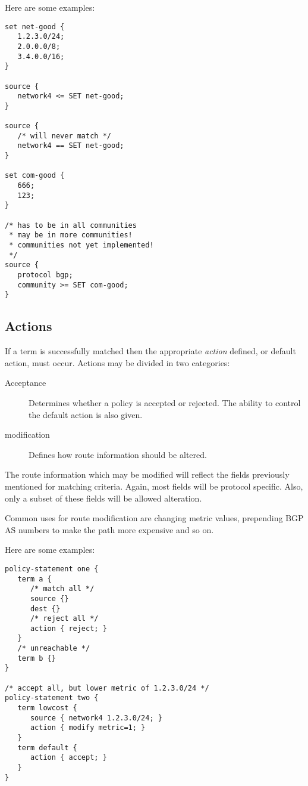 \documentclass{article}
\begin{document}
Here are some examples:
\begin{verbatim}
set net-good {
   1.2.3.0/24;
   2.0.0.0/8;
   3.4.0.0/16;
}

source {
   network4 <= SET net-good;
}

source {
   /* will never match */
   network4 == SET net-good;
}

set com-good {
   666;
   123; 
}

/* has to be in all communities 
 * may be in more communities!
 * communities not yet implemented!
 */
source {
   protocol bgp;
   community >= SET com-good;
}
\end{verbatim}



\subsection{Actions}
If a term is successfully matched then the appropriate {\em action} defined, or default
action, must occur. Actions may be divided in two categories:

\begin{description}
\item[Acceptance] Determines whether a policy is accepted or rejected. The
ability to control the default action is also given.
\item[modification] Defines how route information should be altered. 
\end{description}

The route information which may be modified will reflect the fields previously
mentioned for matching criteria. Again, most fields will be protocol specific.
Also, only a subset of these fields will be allowed alteration.

Common uses for route modification are changing metric values,
prepending BGP AS numbers to make the path more expensive and so on.
%

Here are some examples:
\begin{verbatim}
policy-statement one {
   term a {
      /* match all */
      source {}
      dest {}
      /* reject all */
      action { reject; }
   }
   /* unreachable */
   term b {}
}

/* accept all, but lower metric of 1.2.3.0/24 */
policy-statement two {
   term lowcost {
      source { network4 1.2.3.0/24; }
      action { modify metric=1; }
   }
   term default { 
      action { accept; }
   }
}
\end{verbatim}
\end{document}
